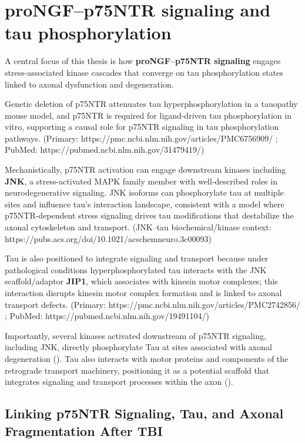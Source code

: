 \documentclass[
  letterpaper,
  DIV=11,
  numbers=noendperiod]{scrreprt}
\begin{document}
\section{proNGF--p75NTR signaling and tau
phosphorylation}\label{prongfp75ntr-signaling-and-tau-phosphorylation}

A central focus of this thesis is how \textbf{proNGF--p75NTR signaling}
engages stress-associated kinase cascades that converge on tau
phosphorylation states linked to axonal dysfunction and degeneration.

Genetic deletion of p75NTR attenuates tau hyperphosphorylation in a
tauopathy mouse model, and p75NTR is required for ligand-driven tau
phosphorylation in vitro, supporting a causal role for p75NTR signaling
in tau phosphorylation pathways. (Primary:
https://pmc.ncbi.nlm.nih.gov/articles/PMC6756909/ ; PubMed:
https://pubmed.ncbi.nlm.nih.gov/31479419/)

Mechanistically, p75NTR activation can engage downstream kinases
including \textbf{JNK}, a stress-activated MAPK family member with
well-described roles in neurodegenerative signaling. JNK isoforms can
phosphorylate tau at multiple sites and influence tau's interaction
landscape, consistent with a model where p75NTR-dependent stress
signaling drives tau modifications that destabilize the axonal
cytoskeleton and transport. (JNK--tau biochemical/kinase context:
https://pubs.acs.org/doi/10.1021/acschemneuro.3c00093)

Tau is also positioned to integrate signaling and transport because
under pathological conditions hyperphosphorylated tau interacts with the
JNK scaffold/adaptor \textbf{JIP1}, which associates with kinesin motor
complexes; this interaction disrupts kinesin motor complex formation and
is linked to axonal transport defects. (Primary:
https://pmc.ncbi.nlm.nih.gov/articles/PMC2742856/ ; PubMed:
https://pubmed.ncbi.nlm.nih.gov/19491104/)

Importantly, several kinases activated downstream of p75NTR signaling,
including JNK, directly phosphorylate Tau at sites associated with
axonal degeneration (). Tau also
interacts with motor proteins and components of the retrograde transport
machinery, positioning it as a potential scaffold that integrates
signaling and transport processes within the axon
().

\subsection{Linking p75NTR Signaling, Tau, and Axonal Fragmentation
After
TBI}\label{linking-p75ntr-signaling-tau-and-axonal-fragmentation-after-tbi}
\end{document}
